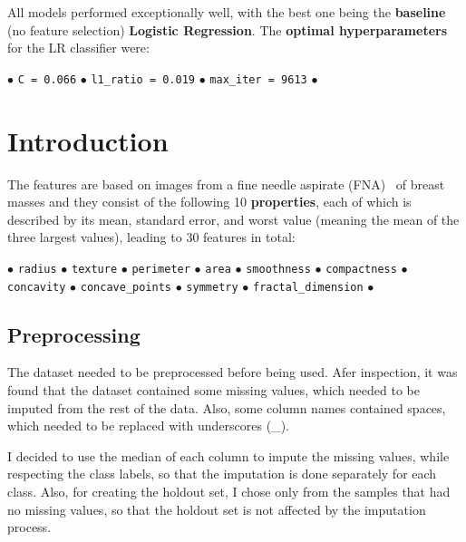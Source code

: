 \documentclass[12pt]{article}
\begin{document}
All models performed exceptionally well, with the best one being the
\textbf{baseline} (no feature selection) \textbf{Logistic Regression}. The
\textbf{optimal hyperparameters} for the LR classifier were:
\begin{center}
    $\bullet$
    \texttt{C = 0.066}
    $\bullet$
    \texttt{l1\_ratio = 0.019}
    $\bullet$
    \texttt{max\_iter = 9613}
    $\bullet$
\end{center}



\section{Introduction}

The features are based on images from a fine needle aspirate (FNA)~\cite{Yu2012}
of breast masses and they consist of the following 10 \textbf{properties}, each
of which is described by its mean, standard error, and worst value (meaning the
mean of the three largest values), leading to 30 features in total:
\begin{center}
    $\bullet$
    \texttt{radius}
    $\bullet$
    \texttt{texture}
    $\bullet$
    \texttt{perimeter}
    $\bullet$
    \texttt{area}
    $\bullet$
    \texttt{smoothness}
    $\bullet$
    \texttt{compactness}
    $\bullet$
    \texttt{concavity}
    $\bullet$
    \texttt{concave\_points}
    $\bullet$
    \texttt{symmetry}
    $\bullet$
    \texttt{fractal\_dimension}
    $\bullet$    
\end{center}


\subsection{Preprocessing}

The dataset needed to be preprocessed before being used. Afer inspection, it was
found that the dataset contained some missing values, which needed to be
imputed from the rest of the data. Also, some column names contained spaces,
which needed to be replaced with underscores (\_).

I decided to use the median of each column to impute the missing values, while
respecting the class labels, so that the imputation is done separately for each
class. Also, for creating the holdout set, I chose only from the samples that
had no missing values, so that the holdout set is not affected by the imputation
process.
\end{document}
